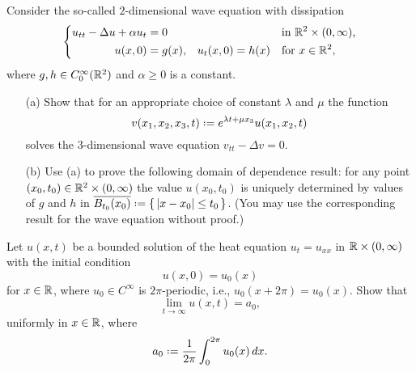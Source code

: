 \begin{problem}
  Consider the so-called \(2\)-dimensional wave equation with dissipation
  \[
    \left\{
      \begin{aligned}
        u_{tt}-\Delta u+\alpha u_t&=0&&&&\text{in \(\mathbb{R}^2\times(0,\infty)\),}\\
        u(x,0)&=g(x),&u_t(x,0)&=h(x)&&\text{for \(x\in\mathbb{R}^2\),}
      \end{aligned}
    \right.
  \]
  where \(g,h\in C_0^\infty(\mathbb{R}^2)\) and \(\alpha\geq 0\) is a constant.
  \begin{itemize}[noitemsep]
  \item[(a)] Show that for an appropriate choice of constant \(\lambda\)
    and \(\mu\) the function
    \[
      v(x_1,x_2,x_3,t)\defeq e^{\lambda t+\mu x_3}u(x_1,x_2,t)
    \]
    solves the \(3\)-dimensional wave equation \(v_{tt}-\Delta v=0\).
  \item[(b)] Use (a) to prove the following domain of dependence result:
    for any point \((x_0,t_0)\in\mathbb{R}^2\times(0,\infty)\) the value
    \(u(x_0,t_0)\) is uniquely determined by values of \(g\) and \(h\) in
    \(\overline{B_{t_0}(x_0)}\defeq\{\,|x-x_0|\leq t_0\,\}\). (You may use
    the corresponding result for the wave equation without proof.)
  \end{itemize}
\end{problem}
\begin{solution*}
\end{solution*}

\begin{problem}
  Let \(u(x,t)\) be a bounded solution of the heat equation \(u_t=u_{xx}\)
  in \(\mathbb{R}\times(0,\infty)\) with the initial condition
  \[
    u(x,0)=u_0(x)
  \]
  for \(x\in\mathbb{R}\), where \(u_0\in C^\infty\) is \(2\pi\)-periodic, i.e.,
  \(u_0(x+2\pi)=u_0(x)\). Show that
  \[
    \lim_{t\to\infty} u(x,t)=a_0,
  \]
  uniformly in \(x\in\mathbb{R}\), where
  \[
    a_0\defeq\frac{1}{2\pi}\int_0^{2\pi} u_0(x)\diff x.
  \]
\end{problem}
\begin{solution*}
\end{solution*}

